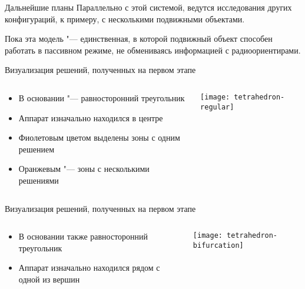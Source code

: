 \documentclass[russian,hyperref={unicode}]{beamer}
\begin{document}
  \begin{frame}{Дальнейшие планы}
    Параллельно с этой системой, ведутся исследования других конфигураций, к примеру,
    с несколькими подвижными объектами.

    Пока эта модель "--- единственная, в которой подвижный объект способен работать в
    пассивном режиме, не обмениваясь информацией с радиоориентирами.
  \end{frame}

  \frame{\titlepage}

  \appendix
  \begin{frame}{Визуализация решений, полученных на первом этапе}
    \begin{columns}[c]
      \begin{column}{.5\textwidth}
        \begin{itemize}
          \item В основании "--- равносторонний треугольник
          \item Аппарат изначально находился в центре
          \item Фиолетовым цветом выделены зоны с одним решением
          \item Оранжевым "--- зоны с несколькими решениями
        \end{itemize}
      \end{column}
      \begin{column}{.5\textwidth}
        \begin{center}
          \texttt{[image: tetrahedron-regular]}
        \end{center}
      \end{column}
    \end{columns}
  \end{frame}

  \begin{frame}{Визуализация решений, полученных на первом этапе}
    \begin{columns}[c]
      \begin{column}{.5\textwidth}
        \begin{itemize}
          \item В основании также равносторонний треугольник
          \item Аппарат изначально находился рядом с одной из вершин
        \end{itemize}
      \end{column}
      \begin{column}{.5\textwidth}
        \begin{center}
          \texttt{[image: tetrahedron-bifurcation]}
        \end{center}
      \end{column}
    \end{columns}
  \end{frame}
\end{document}
